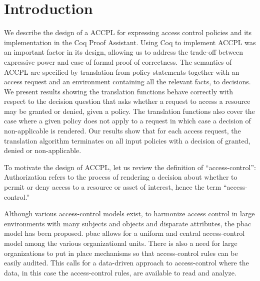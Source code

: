\documentclass[runningheads,a4paper]{llncs}
\begin{document}

\section{Introduction}\label{sec:intro}
We describe the design of a \ac{ACCPL} 
for expressing access control policies
%
and its implementation in the
Coq Proof Assistant. Using Coq to implement \ac{ACCPL} was an
important factor in its design, allowing us to address the trade-off
between expressive power and ease of formal proof of correctness.
The semantics of \ac{ACCPL} are specified by translation from policy
statements together with an access request and an environment
containing all the relevant facts, to decisions. We present results
showing the translation functions behave correctly with respect to the
decision question that asks whether a request to access a resource may
be granted or denied, given a policy. The translation functions also
cover the case where a given policy does not apply to a request in
which case a decision of non-applicable is rendered. Our results show
that for each access request, the translation algorithm terminates on
all input policies with a decision of granted, denied or
non-applicable.

To motivate the design of \ac{ACCPL}, let us review the definition of
``access-control'': Authorization refers to the process of rendering a
decision about whether to permit or deny access to a resource or asset
of interest, hence the term ``access-control.''

Although various access-control models exist, to harmonize access control in large environments with many subjects and objects and disparate attributes, the \ac{pbac}~\cite{nist} model has been proposed. \ac{pbac} allows for a uniform and central access-control model among the various organizational units. There is also a need for large organizations to put in place mechanisms so that access-control rules can be easily audited. This calls for a data-driven approach to access-control where the data, in this case the access-control rules, are available to read and analyze. 
\end{document}
